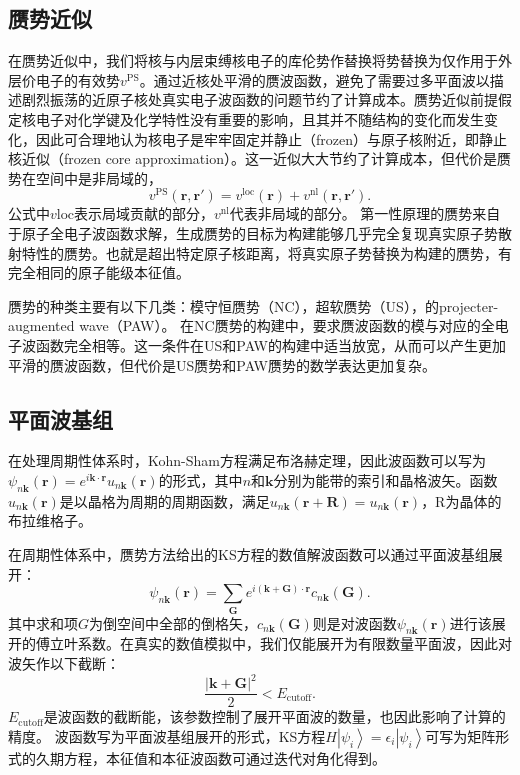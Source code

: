 \subsection{赝势近似}
在赝势近似中，我们将核与内层束缚核电子的库伦势作替换将势替换为仅作用于外层价电子的有效势$v^\mathrm{PS}$。通过近核处平滑的赝波函数，避免了需要过多平面波以描述剧烈振荡的近原子核处真实电子波函数的问题节约了计算成本。赝势近似前提假定核电子对化学键及化学特性没有重要的影响，且其并不随结构的变化而发生变化，因此可合理地认为核电子是牢牢固定并静止（frozen）与原子核附近，即静止核近似（frozen core approximation）。这一近似大大节约了计算成本，但代价是赝势在空间中是非局域的，
\begin{equation}
  v^{\mathrm{PS}}(\bm{r},\bm{r'}) = v^{\mathrm{loc}}(\bm{r}) + v^{\mathrm{nl}}(\bm{r},\bm{r'}).
\end{equation}
公式中$v\mathrm{loc}$表示局域贡献的部分，$v^\mathrm{nl}$代表非局域的部分。
第一性原理的赝势来自于原子全电子波函数求解，生成赝势的目标为构建能够几乎完全复现真实原子势散射特性的赝势。也就是超出特定原子核距离，将真实原子势替换为构建的赝势，有完全相同的原子能级本征值。

赝势的种类主要有以下几类：模守恒赝势（NC）\cite{hamann1979norm}，超软赝势（US）\cite{vanderbilt1990soft}，的projecter-augmented wave（PAW）\cite{blochl1994projector}。 在NC赝势的构建中，要求赝波函数的模与对应的全电子波函数完全相等。这一条件在US和PAW的构建中适当放宽，从而可以产生更加平滑的赝波函数，但代价是US赝势和PAW赝势的数学表达更加复杂。

\subsection{平面波基组}
在处理周期性体系时，Kohn-Sham方程满足布洛赫定理，因此波函数可以写为$\psi_{n\bm{k}}(\bm{r})=e^{i\bm{k}\cdot \bm{r}} u_{n\bm{k}}(\bm{r})$的形式，其中$n$和$\bm{k}$分别为能带的索引和晶格波矢。函数$u_{n\bm{k}}(\bm{r})$是以晶格为周期的周期函数，满足$u_{n\bm{k}}(\bm{r}+\bm{R})=u_{n\bm{k}}(\bm{r})$，R为晶体的布拉维格子。

在周期性体系中，赝势方法给出的KS方程的数值解波函数可以通过平面波基组展开：
\begin{equation}
  \psi_{n\bm{k}}(\bm{r}) = \sum_{\bm{G}}e^{i(\bm{k}+\bm{G})\cdot \bm{r}}c_{n\bm{k}}(\bm{G}).
\end{equation}
其中求和项$G$为倒空间中全部的倒格矢，$c_{n\bm{k}}(\bm{G})$则是对波函数$\psi_{n\bm{k}}(\bm{r})$进行该展开的傅立叶系数。在真实的数值模拟中，我们仅能展开为有限数量平面波，因此对波矢作以下截断：
\begin{equation}
  \frac{|\bm{k} + \bm{G}|^2}{2} < E_{\mathrm{cutoff}}.
\end{equation}
$E_{\mathrm{cutoff}}$是波函数的截断能，该参数控制了展开平面波的数量，也因此影响了计算的精度。
波函数写为平面波基组展开的形式，KS方程$H\left|\psi_i\right>=\epsilon_i\left|\psi_i\right>$可写为矩阵形式的久期方程，本征值和本征波函数可通过迭代对角化得到。

